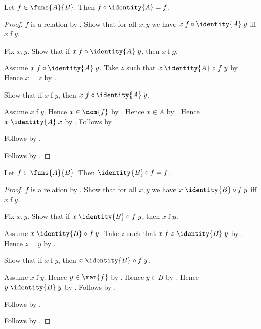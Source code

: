 \begin{proposition}\label{funs_circ_identity_right}
    Let $f\in\funs{A}{B}$.
    Then $f\circ\identity{A}=f$.
\end{proposition}
\begin{proof}
    $f$ is a relation by .
    Show that for all $x,y$ we have
        $x\mathrel{f\circ\identity{A}}y$ iff $x\mathrel{f}y$.
    \begin{subproof}
        Fix $x,y$.
        Show that if $x\mathrel{f\circ\identity{A}}y$, then
            $x\mathrel{f}y$.
        \begin{subproof}
            Assume $x\mathrel{f\circ\identity{A}}y$.
            Take $z$ such that
                $x\mathrel{\identity{A}}z\mathrel{f}y$ by
                .
            Hence $x=z$ by .
        \end{subproof}
        Show that if $x\mathrel{f}y$, then
            $x\mathrel{f\circ\identity{A}}y$.
        \begin{subproof}
            Assume $x\mathrel{f}y$.
            Hence $x\in\dom{f}$ by .
            Hence $x\in A$ by .
            Hence $x\mathrel{\identity{A}}x$ by .
            Follows by .
        \end{subproof}
        Follows by \auto.
    \end{subproof}
    Follows by .
\end{proof}

\begin{proposition}\label{funs_identity_circ_left}
    Let $f\in\funs{A}{B}$.
    Then $\identity{B}\circ f=f$.
\end{proposition}
\begin{proof}
    $f$ is a relation by .
    Show that for all $x,y$ we have
        $x\mathrel{\identity{B}\circ f}y$ iff $x\mathrel{f}y$.
    \begin{subproof}
        Fix $x,y$.
        Show that if $x\mathrel{\identity{B}\circ f}y$, then
            $x\mathrel{f}y$.
        \begin{subproof}
            Assume $x\mathrel{\identity{B}\circ f}y$.
            Take $z$ such that
                $x\mathrel{f}z\mathrel{\identity{B}}y$ by
                .
            Hence $z=y$ by .
        \end{subproof}
        Show that if $x\mathrel{f}y$, then
            $x\mathrel{\identity{B}\circ f}y$.
        \begin{subproof}
            Assume $x\mathrel{f}y$.
            Hence $y\in\ran{f}$ by .
            Hence $y\in B$ by .
            Hence $y\mathrel{\identity{B}}y$ by .
            Follows by .
        \end{subproof}
        Follows by \auto.
    \end{subproof}
    Follows by .
\end{proof}

